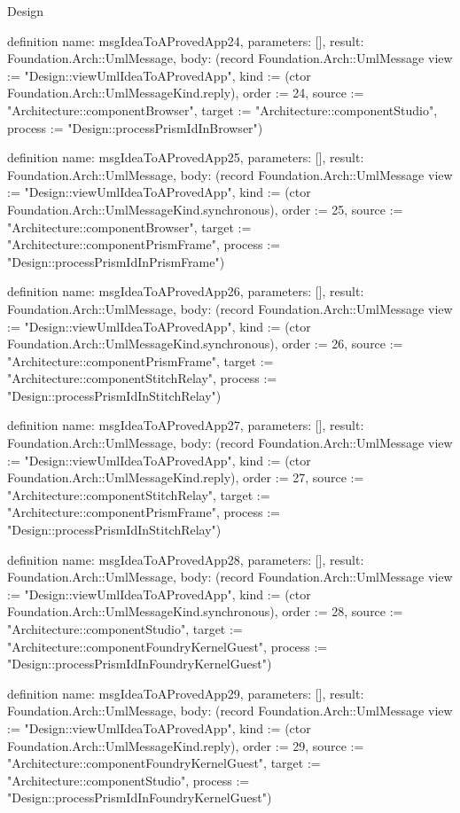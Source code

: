 \begin{lexlean}{Design}
\begin{semanticmodule}
definition{
  name: msgIdeaToAProvedApp24,
  parameters: [],
  result: Foundation.Arch::UmlMessage,
  body: (record Foundation.Arch::UmlMessage {view := "Design::viewUmlIdeaToAProvedApp", kind := (ctor Foundation.Arch::UmlMessageKind.reply), order := 24, source := "Architecture::componentBrowser", target := "Architecture::componentStudio", process := "Design::processPrismIdInBrowser"})
}

definition{
  name: msgIdeaToAProvedApp25,
  parameters: [],
  result: Foundation.Arch::UmlMessage,
  body: (record Foundation.Arch::UmlMessage {view := "Design::viewUmlIdeaToAProvedApp", kind := (ctor Foundation.Arch::UmlMessageKind.synchronous), order := 25, source := "Architecture::componentBrowser", target := "Architecture::componentPrismFrame", process := "Design::processPrismIdInPrismFrame"})
}

definition{
  name: msgIdeaToAProvedApp26,
  parameters: [],
  result: Foundation.Arch::UmlMessage,
  body: (record Foundation.Arch::UmlMessage {view := "Design::viewUmlIdeaToAProvedApp", kind := (ctor Foundation.Arch::UmlMessageKind.synchronous), order := 26, source := "Architecture::componentPrismFrame", target := "Architecture::componentStitchRelay", process := "Design::processPrismIdInStitchRelay"})
}

definition{
  name: msgIdeaToAProvedApp27,
  parameters: [],
  result: Foundation.Arch::UmlMessage,
  body: (record Foundation.Arch::UmlMessage {view := "Design::viewUmlIdeaToAProvedApp", kind := (ctor Foundation.Arch::UmlMessageKind.reply), order := 27, source := "Architecture::componentStitchRelay", target := "Architecture::componentPrismFrame", process := "Design::processPrismIdInStitchRelay"})
}

definition{
  name: msgIdeaToAProvedApp28,
  parameters: [],
  result: Foundation.Arch::UmlMessage,
  body: (record Foundation.Arch::UmlMessage {view := "Design::viewUmlIdeaToAProvedApp", kind := (ctor Foundation.Arch::UmlMessageKind.synchronous), order := 28, source := "Architecture::componentStudio", target := "Architecture::componentFoundryKernelGuest", process := "Design::processPrismIdInFoundryKernelGuest"})
}

definition{
  name: msgIdeaToAProvedApp29,
  parameters: [],
  result: Foundation.Arch::UmlMessage,
  body: (record Foundation.Arch::UmlMessage {view := "Design::viewUmlIdeaToAProvedApp", kind := (ctor Foundation.Arch::UmlMessageKind.reply), order := 29, source := "Architecture::componentFoundryKernelGuest", target := "Architecture::componentStudio", process := "Design::processPrismIdInFoundryKernelGuest"})
}


\end{semanticmodule}
\end{lexlean}

